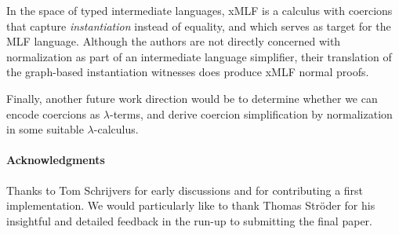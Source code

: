 \documentclass[a4paper,UKenglish]{lipics}
\newcommand{\dv}[1]{{\bf DV:}\begin{color}{red} #1 \end{color}}
\begin{document}
In the space of typed intermediate languages, {\sf xMLF}\cite{Remy-Yakobowski:xmlf} is
a calculus with coercions that capture {\em instantiation} instead of equality, and which serves 
as target for the {\sf MLF} language. Although the authors are not 
directly concerned with normalization as part of an intermediate 
language simplifier, their translation of the graph-based instantiation 
witnesses does produce {\sf xMLF} normal proofs.

Finally, another future work direction would be to 
determine whether we can encode coercions as $\lambda$-terms, and derive coercion 
simplification by normalization in some suitable $\lambda$-calculus.


\paragraph*{Acknowledgments}
Thanks to Tom Schrijvers for early discussions 
and for contributing a first implementation.  We would particularly
like to thank Thomas Str\"{o}der for his insightful and detailed feedback
in the run-up to submitting the final paper.



\end{document}
